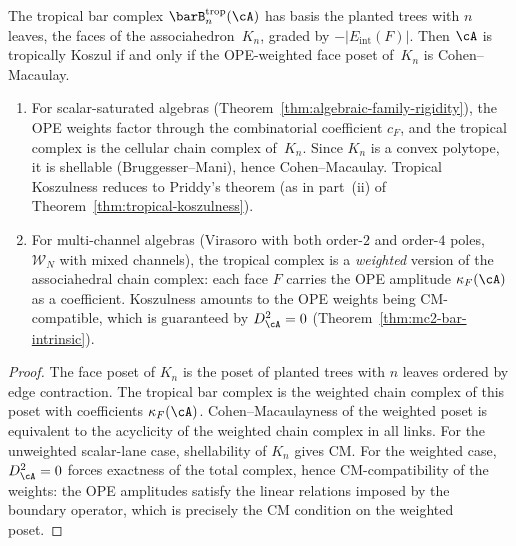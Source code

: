 \begin{corollary}
\label{cor:tropical-cohen-macaulay}
\ClaimStatusProvedHere
{}

The tropical bar complex $\barB^{\mathrm{trop}}_n(\cA)$ has
basis the planted trees with $n$ leaves, the faces of the
associahedron~$K_n$, graded by $-|E_{\mathrm{int}}(F)|$.
Then $\cA$ is tropically Koszul if and only if the OPE-weighted
face poset of~$K_n$ is Cohen--Macaulay.
\begin{enumerate}[label=\textup{(\roman*)}]
\item For scalar-saturated algebras
  \textup{(}Theorem~\textup{\ref{thm:algebraic-family-rigidity})},
  the OPE weights factor through the combinatorial coefficient
  $c_F$, and the tropical complex is the cellular chain complex
  of~$K_n$.  Since $K_n$ is a convex polytope, it is shellable
  \textup{(}Bruggesser--Mani\textup{)}, hence Cohen--Macaulay.
  Tropical Koszulness reduces to Priddy's theorem
  \textup{(}as in part~\textup{(ii)} of
  Theorem~\textup{\ref{thm:tropical-koszulness})}.
\item For multi-channel algebras
  \textup{(}Virasoro with both order-$2$ and order-$4$ poles,
  $\mathcal{W}_N$ with mixed channels\textup{)}, the tropical
  complex is a \emph{weighted} version of the associahedral
  chain complex: each face $F$ carries the OPE amplitude
  $\kappa_F(\cA)$ as a coefficient.  Koszulness amounts to the
  OPE weights being CM-compatible, which is guaranteed by
  $D_\cA^2 = 0$
  \textup{(}Theorem~\textup{\ref{thm:mc2-bar-intrinsic})}.
\end{enumerate}
\end{corollary}

\begin{proof}
The face poset of $K_n$ is the poset of planted trees with $n$
leaves ordered by edge contraction.  The tropical bar complex is
the weighted chain complex of this poset with coefficients
$\kappa_F(\cA)$.  Cohen--Macaulayness of the weighted poset is
equivalent to the acyclicity of the weighted chain complex in all
links.  For the unweighted scalar-lane case, shellability
of $K_n$ gives CM.  For the weighted case, $D_\cA^2 = 0$ forces
exactness of the total complex, hence CM-compatibility of the
weights: the OPE amplitudes satisfy the linear relations imposed
by the boundary operator, which is precisely the CM condition on
the weighted poset.
\end{proof}

